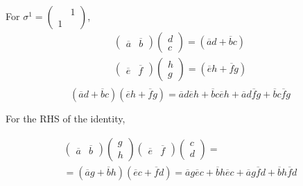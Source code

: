 \documentclass[twoside]{amsart}
\begin{document}
\begin{itemize}
For $\sigma^1 =\left( \begin{matrix} & 1 \\ 1 & \end{matrix} \right)$, 
\[
\begin{aligned}
  (\begin{matrix} \overline{a} & \overline{b} \end{matrix}) \left( \begin{matrix} d \\ c \end{matrix}  \right) = (\overline{a}d + \overline{b} c ) \\ 
  (\begin{matrix} \overline{e} & \overline{f} \end{matrix}) \left( \begin{matrix} h \\ g \end{matrix}  \right) = (\overline{e}h + \overline{f} g ) \\ 
\end{aligned}
\]
\[
(\overline{a} d + \overline{b} c )(\overline{e} h + \overline{f} g) = \overline{a} d \overline{e} h + \overline{b} c \overline{e} h + \overline{a} d \overline{f} g + \overline{b} c\overline{f} g 
\]

For the RHS of the identity, 

\[
\begin{gathered}
  ( \begin{matrix} \overline{a} & \overline{b} \end{matrix} ) \left( \begin{matrix} g \\ h \end{matrix} \right) ( \begin{matrix} \overline{e} & \overline{f} \end{matrix} ) \left( \begin{matrix} c \\ d \end{matrix} \right) = \\ 
  = (\overline{a} g + \overline{b} h )(\overline{e} c + \overline{f} d) = \overline{a} g \overline{e} c +\overline{b} h \overline{e} c + \overline{a} g \overline{f} d + \overline{b} h \overline{f} d
\end{gathered}
\]


\end{itemize}
\end{document}
